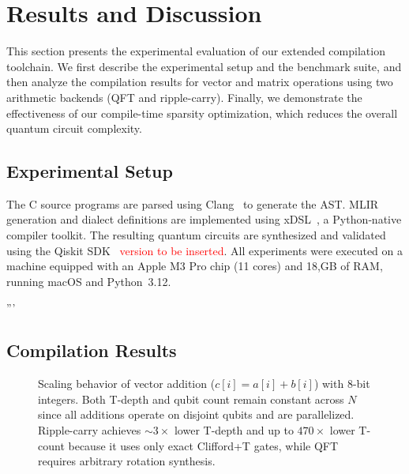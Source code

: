 \section{Results and Discussion}
\label{sec:results}

This section presents the experimental evaluation of our extended compilation toolchain.
We first describe the experimental setup and the benchmark suite, and then analyze the compilation results for vector and matrix operations using two arithmetic backends (QFT and ripple-carry).
Finally, we demonstrate the effectiveness of our compile-time sparsity optimization, which reduces the overall quantum circuit complexity.

\subsection{Experimental Setup}
\label{sec:setup}
The C source programs are parsed using Clang~\cite{clang} to generate the AST.
MLIR generation and dialect definitions are implemented using xDSL~\cite{xdsl}, a Python‑native compiler toolkit. The resulting quantum circuits are synthesized and validated using the Qiskit SDK~\cite{qiskit} \textcolor{red}{version to be inserted}.
All experiments were executed on a machine equipped with an Apple M3 Pro chip (11 cores) and 18,GB of RAM, running macOS and Python~3.12.

%
'''
\subsection{Compilation Results}
\label{sec:compilation-results}

\begin{figure}[!t]
   \centering
   
   \caption{Scaling behavior of vector addition ($c[i] = a[i] + b[i]$) with 8-bit integers. Both T-depth and qubit count remain constant across $N$ since all additions operate on disjoint qubits and are parallelized. Ripple-carry achieves ${\sim}3\times$ lower T-depth and up to $470\times$ lower T-count because it uses only exact Clifford+T gates, while QFT requires arbitrary rotation synthesis.}
  \label{fig:scaling-vecadd}
\end{figure}


